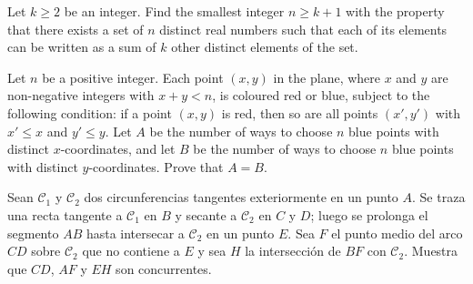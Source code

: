 \documentclass[11pt]{scrartcl}
\begin{document}
\begin{problemax} %
    Let $k\ge2$ be an integer. Find the smallest integer $n \ge k+1$ with the property that there exists a set of $n$ distinct real numbers such that each of its elements can be written as a sum of $k$ other distinct elements of the set.
\end{problemax}

\begin{problemax} %
    Let $n$ be a positive integer. Each point $(x,y)$ in the plane, where $x$ and $y$ are non-negative integers with $x+y<n$, is coloured red or blue, subject to the following condition: if a point $(x,y)$ is red, then so are all points $(x',y')$ with $x'\leq x$ and $y'\leq y$. Let $A$ be the number of ways to choose $n$ blue points with distinct $x$-coordinates, and let $B$ be the number of ways to choose $n$ blue points with distinct $y$-coordinates. Prove that $A=B$.
\end{problemax}

\begin{problemax} %
    
    Sean $\mathcal{C}_1$ y $\mathcal{C}_2$ dos circunferencias tangentes exteriormente en un punto $A$. Se traza una recta tangente a $\mathcal{C}_1$ en $B$ y secante a $\mathcal{C}_2$ en $C$ y $D$; luego se prolonga el segmento $AB$ hasta intersecar a $\mathcal{C}_2$ en un punto $E$. Sea $F$ el punto medio del arco $CD$ sobre $\mathcal{C}_2$ que no contiene a $E$ y sea $H$ la intersección de $BF$ con $\mathcal{C}_2$. Muestra que $CD$, $AF$ y $EH$ son concurrentes.
    
\end{problemax}
\end{document}
